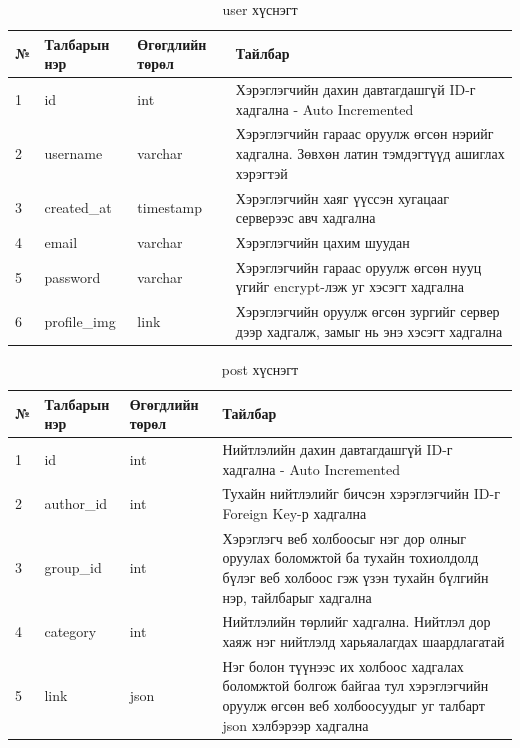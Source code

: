 \begin{table}[h]
	\caption{user хүснэгт}
	\begin{tabular}{|l|l|l|p{8cm}|}
	\hline
	№ &  Талбарын нэр & Өгөгдлийн төрөл & Тайлбар \\ \hline
	1 &  id & int & Хэрэглэгчийн дахин давтагдашгүй ID-г хадгална - Auto Incremented \\ \hline
	2 &  username & varchar & Хэрэглэгчийн гараас оруулж өгсөн нэрийг хадгална. Зөвхөн латин тэмдэгтүүд ашиглах хэрэгтэй \\ \hline
	3 &  created\_at & timestamp & Хэрэглэгчийн хаяг үүссэн хугацааг серверээс авч хадгална \\ \hline
	4 &  email & varchar & Хэрэглэгчийн цахим шуудан \\ \hline
	5 &  password & varchar & Хэрэглэгчийн гараас оруулж өгсөн нууц үгийг encrypt-лэж уг хэсэгт хадгална \\ \hline
	6 &  profile\_img & link & Хэрэглэгчийн оруулж өгсөн зургийг сервер дээр хадгалж, замыг нь энэ хэсэгт хадгална \\ \hline

\end{tabular}
\end{table}

\begin{table}[h]
	\caption{post хүснэгт}
	\begin{tabular}{|l|l|l|p{8cm}|}
	\hline
	№ &  Талбарын нэр & Өгөгдлийн төрөл & Тайлбар \\ \hline
	1 &  id & int & Нийтлэлийн дахин давтагдашгүй ID-г хадгална - Auto Incremented \\ \hline
	2 &  author\_id & int & Тухайн нийтлэлийг бичсэн хэрэглэгчийн ID-г Foreign Key-р хадгална \\ \hline
	3 &  group\_id & int & Хэрэглэгч веб холбоосыг нэг дор олныг оруулах боломжтой ба тухайн тохиолдолд бүлэг веб холбоос гэж үзэн тухайн бүлгийн нэр, тайлбарыг хадгална \\ \hline
	4 &  category & int & Нийтлэлийн төрлийг хадгална. Нийтлэл дор хаяж нэг нийтлэлд харьяалагдах шаардлагатай \\ \hline
	5 &  link & json & Нэг болон түүнээс их холбоос хадгалах боломжтой болгож байгаа тул хэрэглэгчийн оруулж өгсөн веб холбоосуудыг уг талбарт json хэлбэрээр хадгална \\ \hline

\end{tabular}
\end{table}

